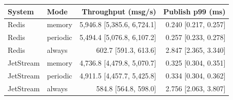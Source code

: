 \begin{tabular}{llrr}
\toprule
System & Mode & Throughput (msg/s) & Publish p99 (ms)\\
\midrule
Redis & memory & 5,946.8 [5,385.6, 6,724.1] & 0.240 [0.217, 0.257]\\
Redis & periodic & 5,494.4 [5,076.8, 6,107.2] & 0.257 [0.233, 0.278]\\
Redis & always & 602.7 [591.3, 613.6] & 2.847 [2.365, 3.340]\\
JetStream & memory & 4,736.8 [4,479.8, 5,070.7] & 0.325 [0.304, 0.351]\\
JetStream & periodic & 4,911.5 [4,457.7, 5,425.8] & 0.334 [0.304, 0.362]\\
JetStream & always & 584.8 [564.8, 598.0] & 2.756 [2.063, 3.807]\\
\bottomrule
\end{tabular}
